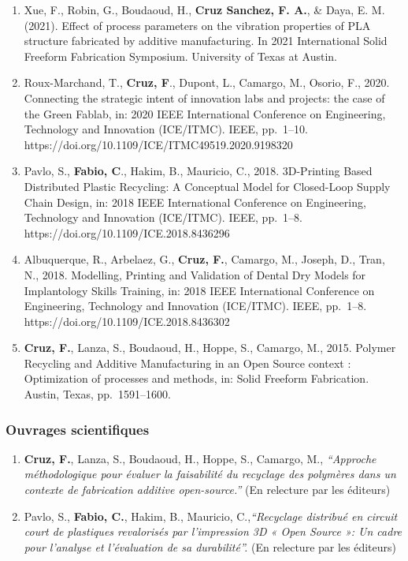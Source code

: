 \documentclass[
  11pt,
]{article}
\begin{document}
\begin{enumerate}
\def\labelenumi{\arabic{enumi}.}
\item
  Xue, F., Robin, G., Boudaoud, H., \textbf{Cruz Sanchez, F. A.}, \&
  Daya, E. M. (2021). Effect of process parameters on the vibration
  properties of PLA structure fabricated by additive manufacturing. In
  2021 International Solid Freeform Fabrication Symposium. University of
  Texas at Austin.
\item
  Roux-Marchand, T., \textbf{Cruz, F}., Dupont, L., Camargo, M., Osorio,
  F., 2020. Connecting the strategic intent of innovation labs and
  projects: the case of the Green Fablab, in: 2020 IEEE International
  Conference on Engineering, Technology and Innovation (ICE/ITMC). IEEE,
  pp.~1--10. https://doi.org/10.1109/ICE/ITMC49519.2020.9198320
\item
  Pavlo, S., \textbf{Fabio, C}., Hakim, B., Mauricio, C., 2018.
  3D-Printing Based Distributed Plastic Recycling: A Conceptual Model
  for Closed-Loop Supply Chain Design, in: 2018 IEEE International
  Conference on Engineering, Technology and Innovation (ICE/ITMC). IEEE,
  pp.~1--8. https://doi.org/10.1109/ICE.2018.8436296
\item
  Albuquerque, R., Arbelaez, G., \textbf{Cruz, F.}, Camargo, M., Joseph,
  D., Tran, N., 2018. Modelling, Printing and Validation of Dental Dry
  Models for Implantology Skills Training, in: 2018 IEEE International
  Conference on Engineering, Technology and Innovation (ICE/ITMC). IEEE,
  pp.~1--8. https://doi.org/10.1109/ICE.2018.8436302
\item
  \textbf{Cruz, F.}, Lanza, S., Boudaoud, H., Hoppe, S., Camargo, M.,
  2015. Polymer Recycling and Additive Manufacturing in an Open Source
  context : Optimization of processes and methods, in: Solid Freeform
  Fabrication. Austin, Texas, pp.~1591--1600.
\end{enumerate}

\hypertarget{ouvrages-scientifiques}{%
\subsubsection{Ouvrages scientifiques}\label{ouvrages-scientifiques}}

\begin{enumerate}
\def\labelenumi{\arabic{enumi}.}
\item
  \textbf{Cruz, F.}, Lanza, S., Boudaoud, H., Hoppe, S., Camargo, M.,
  \emph{``Approche méthodologique pour évaluer la faisabilité du
  recyclage des polymères dans un contexte de fabrication additive
  open-source.''} (En relecture par les éditeurs)
\item
  Pavlo, S., \textbf{Fabio, C.}, Hakim, B., Mauricio,
  C.,\emph{``Recyclage distribué en circuit court de plastiques
  revalorisés par l'impression 3D « Open Source »: Un cadre pour
  l'analyse et l'évaluation de sa durabilité''.} (En relecture par les
  éditeurs)
\end{enumerate}
\end{document}
